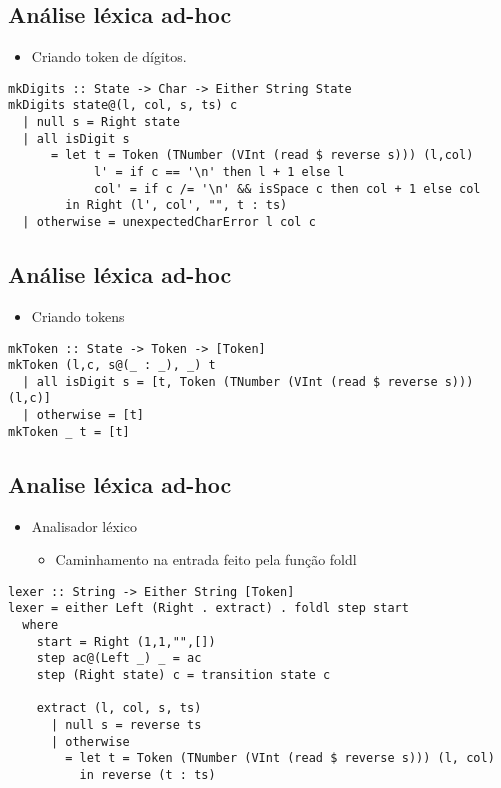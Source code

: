 \documentclass[11pt]{article}
\begin{document}
\subsection*{Análise léxica ad-hoc}
\label{sec:org53f0f7d}

\begin{itemize}
\item Criando token de dígitos.
\end{itemize}

\begin{verbatim}
mkDigits :: State -> Char -> Either String State  
mkDigits state@(l, col, s, ts) c 
  | null s = Right state 
  | all isDigit s 
      = let t = Token (TNumber (VInt (read $ reverse s))) (l,col)
            l' = if c == '\n' then l + 1 else l 
            col' = if c /= '\n' && isSpace c then col + 1 else col  
        in Right (l', col', "", t : ts)
  | otherwise = unexpectedCharError l col c
\end{verbatim}
\subsection*{Análise léxica ad-hoc}
\label{sec:orgd004197}

\begin{itemize}
\item Criando tokens
\end{itemize}

\begin{verbatim}
mkToken :: State -> Token -> [Token]
mkToken (l,c, s@(_ : _), _) t 
  | all isDigit s = [t, Token (TNumber (VInt (read $ reverse s))) (l,c)]
  | otherwise = [t]
mkToken _ t = [t] 
\end{verbatim}
\subsection*{Analise léxica ad-hoc}
\label{sec:org2401242}

\begin{itemize}
\item Analisador léxico 
\begin{itemize}
\item Caminhamento na entrada feito pela função foldl
\end{itemize}
\end{itemize}

\begin{verbatim}
lexer :: String -> Either String [Token]
lexer = either Left (Right . extract) . foldl step start 
  where 
    start = Right (1,1,"",[])
    step ac@(Left _) _ = ac 
    step (Right state) c = transition state c  

    extract (l, col, s, ts) 
      | null s = reverse ts 
      | otherwise 
        = let t = Token (TNumber (VInt (read $ reverse s))) (l, col)
          in reverse (t : ts)
\end{verbatim}
\end{document}
